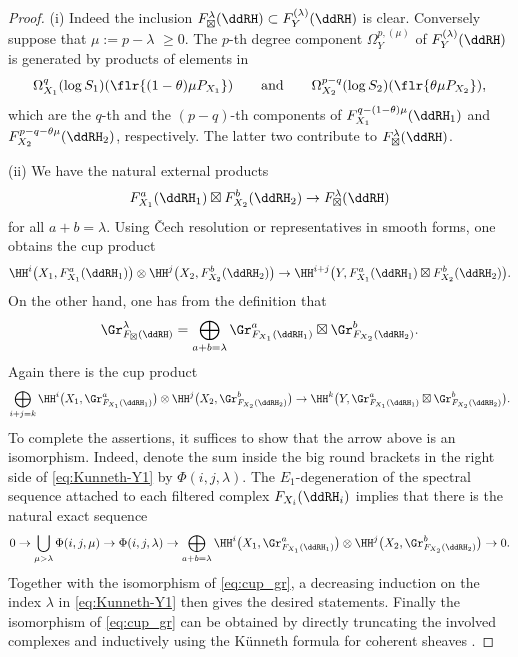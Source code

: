 \begin{proof}(i) Indeed the inclusion $F_\boxtimes^\lambda(\ddRH) \subset F_Y^{(\lambda)}(\ddRH)$ is clear. Conversely suppose that $\mu := p-\lambda$ $\geq 0$. The $p$-th degree component $\Omega_Y^{p,(\mu)}$ of $F_Y^{(\lambda)}(\ddRH)$ is generated by products of elements in
\begin{gather*} \Omega_{X_1}^q(\log S_1)(\flr{(1-\theta)\mu P_{X_1}})\qquad\text{and}\qquad \Omega_{X_2}^{p-q}(\log S_2)(\flr{\theta\mu P_{X_2}}), \end{gather*}
which are the $q$-th and the $(p-q)$-th components of $F_{X_1}^{q-(1-\theta)\mu}(\ddRH_1)$ and $F_{X_2}^{p-q-\theta\mu}(\ddRH_2)$, respectively. The latter two contribute to $F_\boxtimes^\lambda(\ddRH)$.

(ii) We have the natural external products
\begin{gather*} F_{X_1}^a(\ddRH_1)\boxtimes F_{X_2}^b(\ddRH_2)	\to F_\boxtimes^\lambda(\ddRH) \end{gather*}
for all $a+b = \lambda$. Using \v{C}ech resolution or representatives in smooth forms, one obtains the cup product
\begin{gather*} \HH^i\big(X_1,F_{X_1}^a(\ddRH_1)\big)\otimes	\HH^j\big(X_2,F^b_{X_2}(\ddRH_2)\big)\to \HH^{i+j}\big(Y,	F_{X_1}^a(\ddRH_1)\boxtimes F_{X_2}^b(\ddRH_2)\big). \end{gather*}
On the other hand, one has from the definition that
\begin{gather*} \Gr_{F_\boxtimes(\ddRH)}^\lambda = \bigoplus_{a+b=\lambda} \Gr_{F_{X_1}(\ddRH_1)}^a \boxtimes \Gr_{F_{X_2}(\ddRH_2)}^b. \end{gather*}
Again there is the cup product
\begin{gather}\label{eq:cup_gr}
\bigoplus_{i+j=k} \HH^i\big(X_1,\Gr_{F_{X_1}(\ddRH_1)}^a\big)\otimes \HH^j\big(X_2,\Gr_{F_{X_2}(\ddRH_2)}^b\big)\to \HH^k\big(Y, \Gr_{F_{X_1}(\ddRH_1)}^a \boxtimes \Gr_{F_{X_2}(\ddRH_2)}^b \big).
\end{gather}
To complete the assertions, it suffices to show that the arrow above is an isomorphism. Indeed, denote the sum inside the big round brackets in the right side of \eqref{eq:Kunneth-Y1} by $\Phi(i,j,\lambda)$. The $E_1$-degeneration of the spectral sequence attached to each filtered complex $F_{X_i}(\ddRH_i)$ implies that there is the natural exact sequence
\begin{gather*} 0 \to \bigcup_{\mu>\lambda} \Phi(i,j,\mu) \to \Phi(i,j,\lambda) \to\bigoplus_{a+b=\lambda} \HH^i\big(X_1,\Gr_{F_{X_1}(\ddRH_1)}^a\big) \otimes \HH^j\big(X_2,\Gr_{F_{X_2}(\ddRH_2)}^b\big) \to 0. \end{gather*}
Together with the isomorphism of \eqref{eq:cup_gr}, a decreasing induction on the index $\lambda$ in \eqref{eq:Kunneth-Y1} then gives the desired statements. Finally the isomorphism of \eqref{eq:cup_gr} can be obtained by directly truncating the involved complexes and inductively using the K\"unneth formula for coherent sheaves \cite[Theorem~1]{SW}.
\end{proof}

